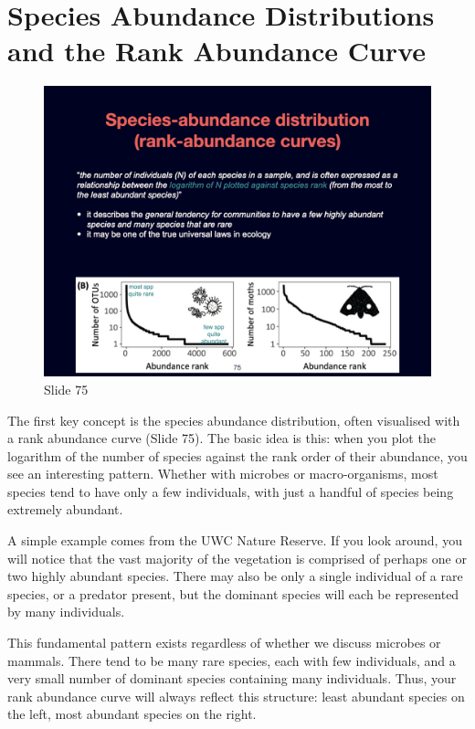 \documentclass[
  11pt,
]{book}
\begin{document}
\section{Species Abundance Distributions and the Rank Abundance
Curve}\label{species-abundance-distributions-and-the-rank-abundance-curve}

\begin{figure}[ht]
\centering
\includegraphics[width=0.8\linewidth]{../images/BDC334/BDC334-075.jpeg}
\caption*{Slide 75}
\end{figure}

The first key concept is the species abundance distribution, often
visualised with a rank abundance curve (Slide 75). The basic idea is
this: when you plot the logarithm of the number of species against the
rank order of their abundance, you see an interesting pattern. Whether
with microbes or macro-organisms, most species tend to have only a few
individuals, with just a handful of species being extremely abundant.

A simple example comes from the UWC Nature Reserve. If you look around,
you will notice that the vast majority of the vegetation is comprised of
perhaps one or two highly abundant species. There may also be only a
single individual of a rare species, or a predator present, but the
dominant species will each be represented by many individuals.

This fundamental pattern exists regardless of whether we discuss
microbes or mammals. There tend to be many rare species, each with few
individuals, and a very small number of dominant species containing many
individuals. Thus, your rank abundance curve will always reflect this
structure: least abundant species on the left, most abundant species on
the right.
\end{document}
